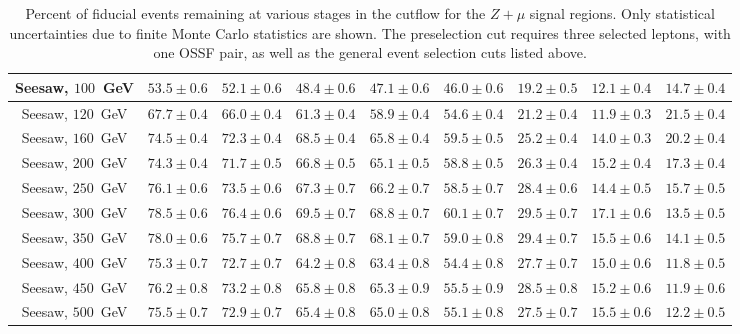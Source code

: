 \begin{table}[ht]
{\begin{tabular}{|c|c|c|c|c|c||c|c|c|}
		\hline
		Seesaw, $100$~GeV	&	$53.5 \pm 0.6$	&	$52.1 \pm 0.6$	&	$48.4 \pm 0.6$	&	$47.1 \pm 0.6$	&	$46.0 \pm 0.6$	&	$19.2 \pm 0.5$ &	$12.1 \pm 0.4$	&	$14.7 \pm 0.4$\\
		\hline
		Seesaw, $120$~GeV	&	$67.7 \pm 0.4$	&	$66.0 \pm 0.4$	&	$61.3 \pm 0.4$	&	$58.9 \pm 0.4$	&	$54.6 \pm 0.4$	&	$21.2 \pm 0.4$ &	$11.9 \pm 0.3$	&	$21.5 \pm 0.4$\\
		\hline
		Seesaw, $160$~GeV	&	$74.5 \pm 0.4$	&	$72.3 \pm 0.4$	&	$68.5 \pm 0.4$	&	$65.8 \pm 0.4$	&	$59.5 \pm 0.5$	&	$25.2 \pm 0.4$ &	$14.0 \pm 0.3$	&	$20.2 \pm 0.4$\\
		\hline
		Seesaw, $200$~GeV	&	$74.3 \pm 0.4$	&	$71.7 \pm 0.5$	&	$66.8 \pm 0.5$	&	$65.1 \pm 0.5$	&	$58.8 \pm 0.5$	&	$26.3 \pm 0.4$ &	$15.2 \pm 0.4$	&	$17.3 \pm 0.4$\\
		\hline
		Seesaw, $250$~GeV	&	$76.1 \pm 0.6$	&	$73.5 \pm 0.6$	&	$67.3 \pm 0.7$	&	$66.2 \pm 0.7$	&	$58.5 \pm 0.7$	&	$28.4 \pm 0.6$ &	$14.4 \pm 0.5$	&	$15.7 \pm 0.5$\\
		\hline
		Seesaw, $300$~GeV	&	$78.5 \pm 0.6$	&	$76.4 \pm 0.6$	&	$69.5 \pm 0.7$	&	$68.8 \pm 0.7$	&	$60.1 \pm 0.7$	&	$29.5 \pm 0.7$ &	$17.1 \pm 0.6$	&	$13.5 \pm 0.5$\\
		\hline
		Seesaw, $350$~GeV	&	$78.0 \pm 0.6$	&	$75.7 \pm 0.7$	&	$68.8 \pm 0.7$	&	$68.1 \pm 0.7$	&	$59.0 \pm 0.8$	&	$29.4 \pm 0.7$ &	$15.5 \pm 0.6$	&	$14.1 \pm 0.5$\\
		\hline
		Seesaw, $400$~GeV	&	$75.3 \pm 0.7$	&	$72.7 \pm 0.7$	&	$64.2 \pm 0.8$	&	$63.4 \pm 0.8$	&	$54.4 \pm 0.8$	&	$27.7 \pm 0.7$ &	$15.0 \pm 0.6$	&	$11.8 \pm 0.5$\\
		\hline
		Seesaw, $450$~GeV	&	$76.2 \pm 0.8$	&	$73.2 \pm 0.8$	&	$65.8 \pm 0.8$	&	$65.3 \pm 0.9$	&	$55.5 \pm 0.9$	&	$28.5 \pm 0.8$ &	$15.2 \pm 0.6$	&	$11.9 \pm 0.6$\\
		\hline
		Seesaw, $500$~GeV	&	$75.5 \pm 0.7$	&	$72.9 \pm 0.7$	&	$65.4 \pm 0.8$	&	$65.0 \pm 0.8$	&	$55.1 \pm 0.8$	&	$27.5 \pm 0.7$ &	$15.5 \pm 0.6$	&	$12.2 \pm 0.5$\\
		\hline
	\end{tabular}
	}
	\caption{Percent of fiducial events remaining at various stages in the cutflow for the $Z+\mu$ signal regions. Only statistical uncertainties due to finite Monte Carlo statistics are shown. The preselection cut requires three selected leptons, with one OSSF pair, as well as the general event selection cuts listed above.}
	\label{table:fiducial-efficiencies-Zmu}
\end{table}


